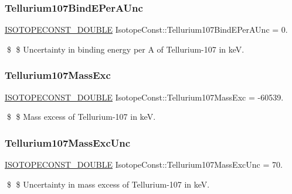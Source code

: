 \subsubsection{\texorpdfstring{Tellurium107\+Bind\+E\+Per\+A\+Unc}{Tellurium107BindEPerAUnc}}
{\footnotesize\ttfamily \mbox{\hyperlink{group___isotope_const-_macros_ga8f45a7272ce02c0b4c65c44636ed719a}{I\+S\+O\+T\+O\+P\+E\+C\+O\+N\+S\+T\+\_\+\+D\+O\+U\+B\+LE}} Isotope\+Const\+::\+Tellurium107\+Bind\+E\+Per\+A\+Unc = 0.}

\$ \$ Uncertainty in binding energy per A of Tellurium-\/107 in keV. \mbox{\label{group___isotope_const-_tellurium-_te107_ga181e1a38afe07a5663fae18eb6f62923}} 
\subsubsection{\texorpdfstring{Tellurium107\+Mass\+Exc}{Tellurium107MassExc}}
{\footnotesize\ttfamily \mbox{\hyperlink{group___isotope_const-_macros_ga8f45a7272ce02c0b4c65c44636ed719a}{I\+S\+O\+T\+O\+P\+E\+C\+O\+N\+S\+T\+\_\+\+D\+O\+U\+B\+LE}} Isotope\+Const\+::\+Tellurium107\+Mass\+Exc = -\/60539.}

\$ \$ Mass excess of Tellurium-\/107 in keV. \mbox{\label{group___isotope_const-_tellurium-_te107_gaa3797e7cd4a4103c0685457d6d638e25}} 
\subsubsection{\texorpdfstring{Tellurium107\+Mass\+Exc\+Unc}{Tellurium107MassExcUnc}}
{\footnotesize\ttfamily \mbox{\hyperlink{group___isotope_const-_macros_ga8f45a7272ce02c0b4c65c44636ed719a}{I\+S\+O\+T\+O\+P\+E\+C\+O\+N\+S\+T\+\_\+\+D\+O\+U\+B\+LE}} Isotope\+Const\+::\+Tellurium107\+Mass\+Exc\+Unc = 70.}

\$ \$ Uncertainty in mass excess of Tellurium-\/107 in keV. \mbox{\label{group___isotope_const-_tellurium-_te107_ga52cebdc50689673ea0fafb0fed0ae896}} 
